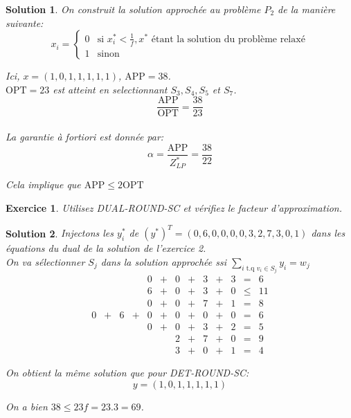 \documentclass[a4paper,11pt]{report}
\newcommand{\algo}[1]{\textsc{#1}}
\newtheorem{exercice}{Exercice}
\newtheorem{solution}{Solution}
\begin{document}
\begin{solution}
On construit la solution approchée au problème $P_2$ de la manière suivante:
$$
x_i =
\begin{cases}
0 & \text{si } x_i^* < \frac{1}{f}, x^*\text{ étant la solution du
problème relaxé}\\
1 & \text{sinon}
\end{cases}
$$

\noindent Ici, $x=(1,0,1,1,1,1,1)$, $\text{APP}=38$.\\
$\text{OPT}=23$ est atteint en selectionnant $S_3, S_4, S_5$ et $S_7$.
$$\frac{\text{APP}}{\text{OPT}} = \frac{38}{23}$$\\

\noindent La garantie à fortiori est donnée par:
$$
\alpha = \frac{\text{APP}}{Z_{LP}^*} = \frac{38}{22}
$$

\noindent Cela implique que $\text{APP} \le 2\text{OPT}$
\end{solution}

\begin{exercice}
Utilisez \algo{DUAL-ROUND-SC} et vérifiez le facteur d'approximation.
\end{exercice}

\begin{solution}
Injectons les $y^*_i$ de $(y^*)^T = (0,6,0,0,0,0,3,2,7,3,0,1)$ dans les
équations du dual de la solution de l'exercice 2.\\

\noindent On va sélectionner $S_j$ dans la solution approchée ssi
$\sum\limits_{i \text{ t.q } v_i \in S_j}{y_i} = w_j$
$$
\begin{array}{ccccccccccccc}
    &   &     &   & 0 & + & 0 & + & 3 & + & 3 & =   & 6\\
    &   &     &   & 6 & + & 0 & + & 3 & + & 0 & \le & 11\\
    &   &     &   & 0 & + & 0 & + & 7 & + & 1 & =   & 8\\
 0  & + &  6  & + & 0 & + & 0 & + & 0 & + & 0 & =   & 6\\
    &   &     &   & 0 & + & 0 & + & 3 & + & 2 & =   & 5\\
    &   &     &   &     &   & 2 & + & 7 & + & 0 & = & 9\\
    &   &     &   &     &   & 3 & + & 0 & + & 1 & = & 4
\end{array}
$$

\noindent On obtient la même solution que pour \algo{DET-ROUND-SC}:
$$
y=(1,0,1,1,1,1,1)
$$

On a bien $38 \le 23 f = 23 . 3 = 69$.
\end{solution}
\end{document}
